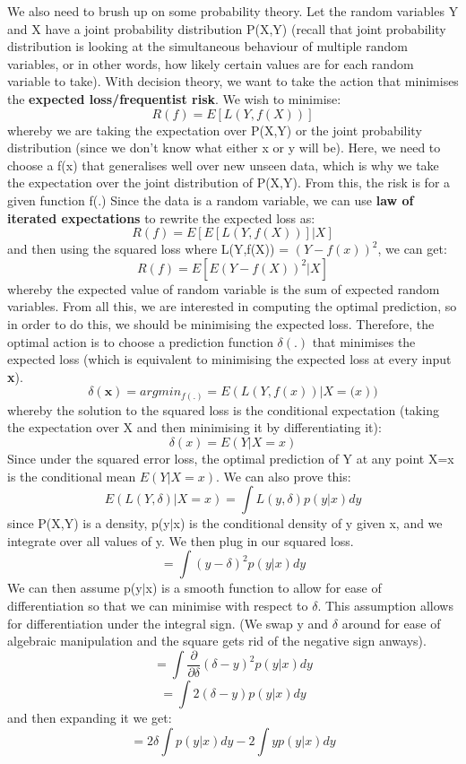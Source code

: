 \documentclass[11pt, oneside]{article}
\theoremstyle{definition}
\begin{document}
We also need to brush up on some probability theory. Let the random variables Y and X have a joint probability distribution P(X,Y) (recall that joint probability distribution is looking at the simultaneous behaviour of multiple random variables, or in other words, how likely certain values are for each random variable to take). With decision theory, we want to take the action that minimises the \textbf{expected loss/frequentist risk}. We wish to minimise:
$$
R(f) = E[L(Y,f(X))]
$$
whereby we are taking the expectation over P(X,Y) or the joint probability distribution (since we don't know what either x or y will be). Here, we need to choose a f(x) that generalises well over new unseen data, which is why we take the expectation over the joint distribution of P(X,Y). From this, the risk is for a given function f(.) Since the data is a random variable, we can use \textbf{law of iterated expectations} to rewrite the expected loss as:
$$
R(f) = E[E[L(Y,f(X))]|X]
$$
and then using the squared loss where L(Y,f(X)) = $(Y-f(x))^2$, we can get:
$$
R(f) = E[E(Y - f(X))^2|X]
$$
whereby the expected value of random variable is the sum of expected random variables. From all this, we are interested in computing the optimal prediction, so in order to do this, we should be minimising the expected loss. Therefore, the optimal action is to choose a prediction function $\delta(.)$ that minimises the expected loss (which is equivalent to minimising the expected loss at every input \textbf{x}).
$$
\delta(\bm{x}) = argmin_{f(.)} = E(L(Y, f(x))|X=\bm(x))
$$
whereby the solution to the squared loss is the conditional expectation (taking the expectation over X and then minimising it by differentiating it):
$$
\delta(x) = E(Y|X=x)
$$
Since under the squared error loss, the optimal prediction of Y at any point X=x is the conditional mean $E(Y|X=x)$. We can also prove this:
$$
E(L(Y,\delta)|X=x) = \int L(y,\delta)p(y|x)dy
$$
since P(X,Y) is a density, p(y$|$x) is the conditional density of y given x, and we integrate over all values of y. We then plug in our squared loss.
$$
= \int(y-\delta)^2p(y|x)dy
$$
We can then assume p(y$|$x) is a smooth function to allow for ease of differentiation so that we can minimise with respect to $\delta$. This assumption allows for differentiation under the integral sign. (We swap y and $\delta$ around for ease of algebraic manipulation and the square gets rid of the negative sign anways).
$$
= \int \frac{\partial}{\partial \delta}(\delta - y)^2p(y|x)dy
$$
$$
= \int 2(\delta-y)p(y|x)dy
$$
and then expanding it we get:
$$
= 2\delta\int p(y|x)dy - 2\int yp(y|x)dy
$$
\end{document}
